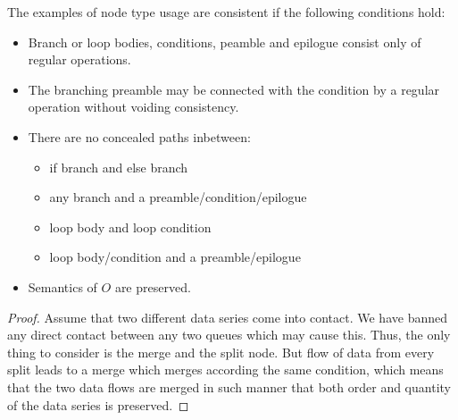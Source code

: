 \begin{observation}
  The examples of node type usage are consistent if the following conditions hold:
  \begin{itemize}
    \item Branch or loop bodies, conditions, peamble and epilogue consist only of regular operations.
    \item The branching preamble may be connected with the condition by a regular operation without voiding consistency.
    \item There are no concealed paths inbetween:
      \begin{itemize}
        \item if branch and else branch
        \item any branch and a preamble/condition/epilogue
        \item loop body and loop condition
        \item loop body/condition and a preamble/epilogue
      \end{itemize}
    \item Semantics of $O$ are preserved.
    \end{itemize}
  \begin{proof} 
    Assume that two different data series come into contact. We have banned any direct contact between any two queues which may cause this. Thus, the only thing to consider is the merge and the split node. But flow of data from every split leads to a merge which merges according the same condition, which means that the two data flows are merged in such manner that both order and quantity of the data series is preserved.
  \end{proof}
\end{observation}

